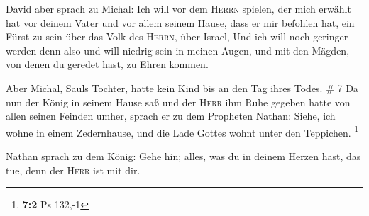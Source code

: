  David aber sprach zu Michal: Ich will vor dem
\textsc{Herrn} spielen, der mich erwählt hat vor deinem Vater und vor
allem seinem Hause, dass er mir befohlen hat, ein Fürst zu sein über das
Volk des \textsc{Herrn}, über Israel,  Und ich will noch
geringer werden denn also und will niedrig sein in meinen Augen, und mit
den Mägden, von denen du geredet hast, zu Ehren kommen.

 Aber Michal, Sauls Tochter, hatte kein Kind bis an den
Tag ihres Todes. \# 7  Da nun der König in seinem Hause
saß und der \textsc{Herr} ihm Ruhe gegeben hatte von allen seinen
Feinden umher,  sprach er zu dem Propheten Nathan: Siehe,
ich wohne in einem Zedernhause, und die Lade Gottes wohnt unter den
Teppichen. \footnote{\textbf{7:2} Ps 132,-1}

 Nathan sprach zu dem König: Gehe hin; alles, was du in
deinem Herzen hast, das tue, denn der \textsc{Herr} ist mit dir.

